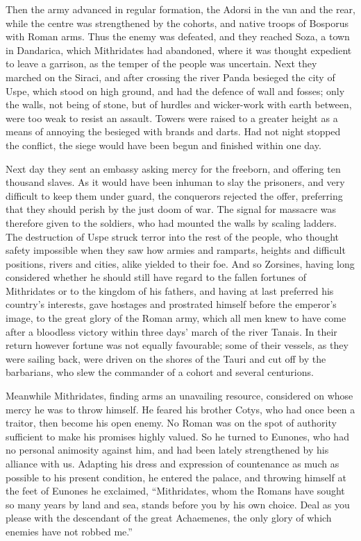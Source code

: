 
Then the army advanced in regular formation, the Adorsi in the van and the rear, while the centre was strengthened by the cohorts, and native troops of Bosporus with Roman arms. Thus the enemy was defeated, and they reached Soza, a town in Dandarica, which Mithridates had abandoned, where it was thought expedient to leave a garrison, as the temper of the people was uncertain. Next they marched on the Siraci, and after crossing the river Panda besieged the city of Uspe, which stood on high ground, and had the defence of wall and fosses; only the walls, not being of stone, but of hurdles and wicker-work with earth between, were too weak to resist an assault. Towers were raised to a greater height as a means of annoying the besieged with brands and darts. Had not night stopped the conflict, the siege would have been begun and finished within one day.


Next day they sent an embassy asking mercy for the freeborn, and offering ten thousand slaves. As it would have been inhuman to slay the prisoners, and very difficult to keep them under guard, the conquerors rejected the offer, preferring that they should perish by the just doom of war. The signal for massacre was therefore given to the soldiers, who had mounted the walls by scaling ladders. The destruction of Uspe struck terror into the rest of the people, who thought safety impossible when they saw how armies and ramparts, heights and difficult positions, rivers and cities, alike yielded to their foe. And so Zorsines, having long considered whether he should still have regard to the fallen fortunes of Mithridates or to the kingdom of his fathers, and having at last preferred his country's interests, gave hostages and prostrated himself before the emperor's image, to the great glory of the Roman army, which all men knew to have come after a bloodless victory within three days' march of the river Tanais. In their return however fortune was not equally favourable; some of their vessels, as they were sailing back, were driven on the shores of the Tauri and cut off by the barbarians, who slew the commander of a cohort and several centurions.


Meanwhile Mithridates, finding arms an unavailing resource, considered on whose mercy he was to throw himself. He feared his brother Cotys, who had once been a traitor, then become his open enemy. No Roman was on the spot of authority sufficient to make his promises highly valued. So he turned to Eunones, who had no personal animosity against him, and had been lately strengthened by his alliance with us. Adapting his dress and expression of countenance as much as possible to his present condition, he entered the palace, and throwing himself at the feet of Eunones he exclaimed, ``Mithridates, whom the Romans have sought so many years by land and sea, stands before you by his own choice. Deal as you please with the descendant of the great Achaemenes, the only glory of which enemies have not robbed me.''


